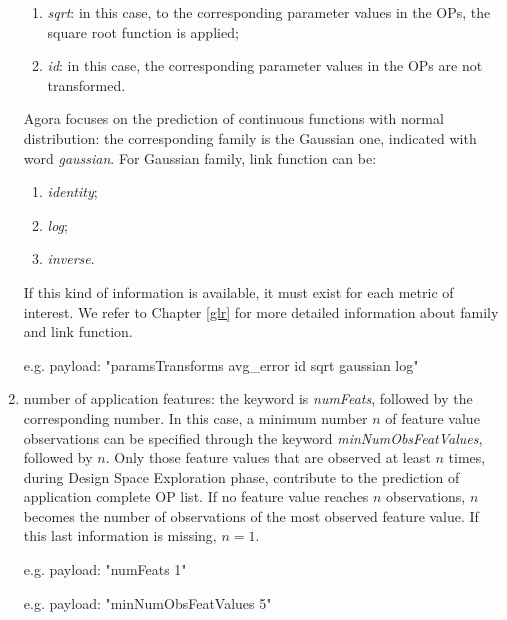 \begin{enumerate}
\begin{enumerate}
        \item \textit{sqrt}: in this case, to the corresponding parameter values in the OPs, the square root function is applied;
        
        \item \textit{id}: in this case, the corresponding parameter values in the OPs are not transformed.
    
    \end{enumerate}
    
    Agora focuses on the prediction of continuous functions with normal distribution: the corresponding family is the Gaussian one, indicated with word \textit{gaussian}. For Gaussian family, link function can be:
    
    \begin{enumerate}
    
        \item \textit{identity};
        
        \item \textit{log};
        
        \item \textit{inverse}.
    
    \end{enumerate}
    
    If this kind of information is available, it must exist for each metric of interest. We refer to Chapter \ref{glr} for more detailed information about family and link function.
    
    e.g. payload: "paramsTransforms avg\_error id sqrt gaussian log"
    
    \item number of application features: the keyword is \textit{numFeats}, followed by the corresponding number. In this case, a minimum number $n$ of feature value observations can be specified through the keyword \textit{minNumObsFeatValues}, followed by $n$. Only those feature values that are observed at least $n$ times, during Design Space Exploration phase, contribute to the prediction of application complete OP list. If no feature value reaches $n$ observations, $n$ becomes the number of observations of the most observed feature value. If this last information is missing, $n = 1$.
    
    e.g. payload: "numFeats 1"
    
    e.g. payload: "minNumObsFeatValues 5"

\end{enumerate}

